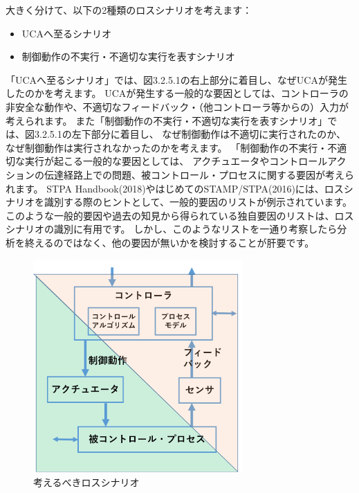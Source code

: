 大きく分けて、以下の2種類のロスシナリオを考えます：
%
\begin{itemize}
    \item UCAへ至るシナリオ
    \item 制御動作の不実行・不適切な実行を表すシナリオ
\end{itemize}
%
「UCAへ至るシナリオ」では、図3.2.5.1の右上部分に着目し、なぜUCAが発生したのかを考えます。
UCAが発生する一般的な要因としては、コントローラの非安全な動作や、不適切なフィードバック・（他コントローラ等からの）入力が考えられます。
また「制御動作の不実行・不適切な実行を表すシナリオ」では、図3.2.5.1の左下部分に着目し、
なぜ制御動作は不適切に実行されたのか、なぜ制御動作は実行されなかったのかを考えます。
「制御動作の不実行・不適切な実行が起こる一般的な要因としては、
アクチュエータやコントロールアクションの伝達経路上での問題、被コントロール・プロセスに関する要因が考えられます。
STPA Handbook(2018)やはじめてのSTAMP/STPA(2016)には、ロスシナリオを識別する際のヒントとして、一般的要因のリストが例示されています。
このような一般的要因や過去の知見から得られている独自要因のリストは、ロスシナリオの識別に有用です。
しかし、このようなリストを一通り考察したら分析を終えるのではなく、他の要因が無いかを検討することが肝要です。
%
\begin{figure}[H]
    \centering
    \includegraphics[width=80mm]{safety_assurance_contents/ch3images/fig-3-2-5-01.png}
    \caption[short]{考えるべきロスシナリオ}
\end{figure}

